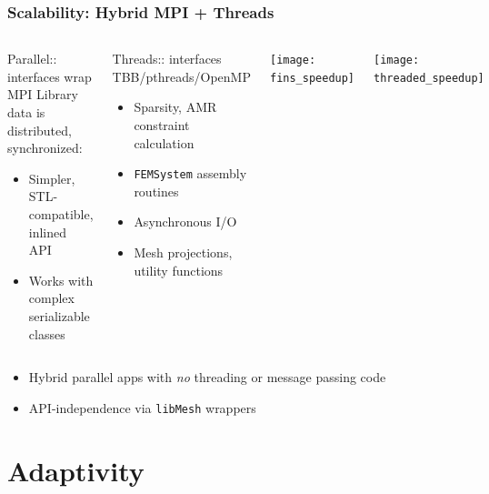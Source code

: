 \documentclass[mathserif]{beamer}
\newcommand{\libMesh}{\texttt{libMesh}\xspace}
\begin{document}
\begin{frame}
\frametitle{Scalability: Hybrid MPI + Threads}

\begin{columns}
\begin{block}{Parallel:: interfaces wrap MPI}
Library data is distributed, synchronized:
\begin{itemize}
	\item Simpler, STL-compatible, inlined API
	\item Works with complex serializable classes
\end{itemize}
\end{block}

\begin{block}{Threads:: interfaces TBB/pthreads/OpenMP}
\begin{itemize}
	\item Sparsity, AMR constraint calculation
	\item {\texttt{FEMSystem}} assembly routines
	\item Asynchronous I/O
	\item Mesh projections, utility functions
\end{itemize}
\end{block}

\center
\texttt{[image: fins\_speedup]}

\center
\texttt{[image: threaded\_speedup]}

\end{columns}

\begin{itemize}
	\item Hybrid parallel apps with {\emph{no}}
		threading or message passing code
	\item API-independence via \libMesh{} wrappers
\end{itemize}
\end{frame}




\section{Adaptivity}
\end{document}
